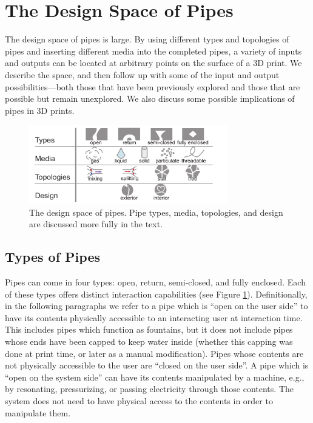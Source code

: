 \section{The Design Space of Pipes}
The design space of pipes is large.  By using different types and topologies of pipes and inserting different media into the completed pipes, a variety of inputs and outputs can be located at arbitrary points on the surface of a 3D print.  We describe the  space, and then follow up with some of the input and output possibilities---both those that have been previously explored and those that are possible but remain unexplored.  We also discuss some possible implications of pipes in 3D prints.

\begin{figure}[h!]
\centering
    \includegraphics[width=3.4in]{figures/tubespace.pdf}
\caption{The design space of pipes.  Pipe types, media, topologies, and design are discussed more fully in the text.}
\label{fig:pipespace}
\end{figure}

\subsection{Types of Pipes}

Pipes can come in four types: open, return, semi-closed, and fully enclosed.  Each of these types offers distinct interaction capabilities (see Figure \ref{fig:pipespace}).  Definitionally, in the following paragraphs we refer to a pipe which is ``open on the user side'' to have its contents physically accessible to an interacting user at interaction time.  This includes pipes which function as fountains, but it does not include pipes whose ends have been capped to keep water inside (whether this capping was done at print time, or later as a manual modification).  Pipes whose contents are not physically accessible to the user are ``closed on the user side''.  A pipe which is ``open on the system side'' can have its contents manipulated by a machine, e.g., by resonating, pressurizing, or passing electricity through those contents.  The system does not need to have physical access to the contents in order to manipulate them.

